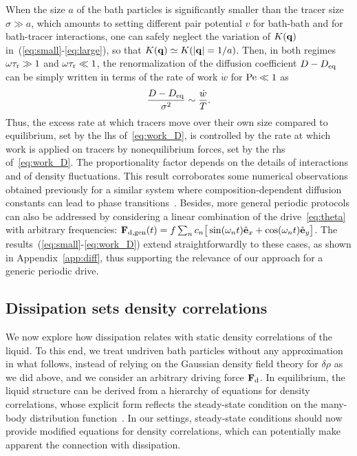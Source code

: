 \documentclass[superscriptaddress, twocolumn, prx, longbibliography, nofootinbib]{revtex4-1}
\begin{document}
When the size $a$ of the bath particles is significantly smaller than the tracer size $\sigma\gg a$, which amounts to setting different pair potential $v$ for bath-bath and for bath-tracer interactions, one can safely neglect the variation of $K({\bf q})$ in~(\ref{eq:small}-\ref{eq:large}), so that $K({\bf q}) \simeq K(|{\bf q}|=1/a)$. Then, in both regimes $\omega\tau_{\rm r}\gg 1$ and $\omega\tau_{\rm r}\ll 1$, the renormalization of the diffusion coefficient $D-D_{\rm eq}$ can be simply written in terms of the rate of work $\dot w$ for ${\rm Pe}\ll1$ as
\begin{equation}\label{eq:work_D}
	\frac{D-D_{\rm eq}}{\sigma^2} \sim \frac{\dot w}{T} .
\end{equation}
Thus, the excess rate at which tracers move over their own size compared to equilibrium, set by the lhs of~\eqref{eq:work_D}, is controlled by the rate at which work is applied on tracers by nonequilibrium forces, set by the rhs of~\eqref{eq:work_D}. The proportionality factor depends on the details of interactions and of density fluctuations. This result corroborates some numerical observations obtained previously for a similar system where composition-dependent diffusion constants can lead to phase transitions~\cite{delJunco2018}. Besides, more general periodic protocols can also be addressed by considering a linear combination of the drive~\eqref{eq:theta} with arbitrary frequencies: ${\bf F}_{\rm d, gen}(t) = f \sum_n c_n\big[\sin(\omega_n t) \hat{\bf e}_x + \cos(\omega_n t)\hat{\bf e}_y \big]$. The results~(\ref{eq:small}-\ref{eq:work_D}) extend straightforwardly to these cases, as shown in Appendix~\ref{app:diff}, thus supporting the relevance of our approach for a generic periodic drive.




\subsection{Dissipation sets density correlations}\label{sec:struc}

We now explore how dissipation relates with static density correlations of the liquid. To this end, we treat undriven bath particles without any approximation in what follows, instead of relying on the Gaussian density field theory for $\delta\rho$ as we did above, and we consider an arbitrary driving force ${\bf F}_{\rm d}$. In equilibrium, the liquid structure can be derived from a hierarchy of equations for density correlations, whose explicit form reflects the steady-state condition on the many-body distribution function~\cite{Hansen2013}. In our settings, steady-state conditions should now provide modified equations for density correlations, which can potentially make apparent the connection with dissipation.
\end{document}
